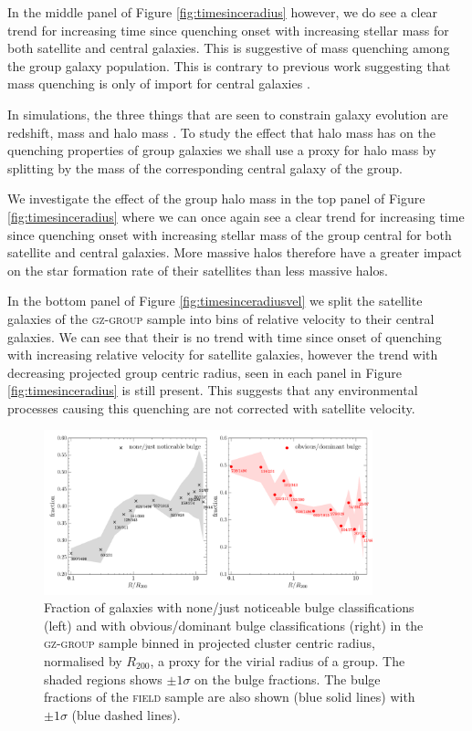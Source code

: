\documentclass[useAMS,usenatbib]{mn2e}
\begin{document}
In the middle panel of Figure \ref{fig:timesinceradius} however, we do see a clear trend for increasing time since quenching onset with increasing stellar mass for both satellite and central galaxies. This is suggestive of mass quenching among the group galaxy population. This is contrary to previous work suggesting that mass quenching is only of import for central galaxies \citep{ref, ref, ref}. 

In simulations, the three things that are seen to constrain galaxy evolution are redshift, mass and halo mass \cite{ref, ref}. To study the effect that halo mass has on the quenching properties of group galaxies we shall use a proxy for halo mass by splitting by the mass of the corresponding central galaxy of the group.

We investigate the effect of the group halo mass in the top panel of Figure \ref{fig:timesinceradius} where we can once again see a clear trend for increasing time since quenching onset with increasing stellar mass of the group central for both satellite and central galaxies. More massive halos therefore have a greater impact on the star formation rate of their satellites than less massive halos. 

In the bottom panel of Figure \ref{fig:timesinceradiusvel} we split the satellite galaxies of the \textsc{gz-group} sample into bins of relative velocity to their central galaxies. We can see that their is no trend with time since onset of quenching with increasing relative velocity for satellite galaxies, however the trend with decreasing projected group centric radius, seen in each panel in Figure \ref{fig:timesinceradius} is still present. This suggests that any environmental processes causing this quenching are not corrected with satellite velocity.  

\begin{figure}
\includegraphics[width=0.85\textwidth]{min_max_bulge_fraction_trend_with_log_radius.pdf}
\caption{Fraction of galaxies with none/just noticeable bulge classifications (left) and with obvious/dominant bulge classifications (right) in the \textsc{gz-group} sample binned in projected cluster centric radius, normalised by $R_{200}$, a proxy for the virial radius of a group. The shaded regions shows $\pm1\sigma$ on the bulge fractions. The bulge fractions of the \textsc{field} sample are also shown (blue solid lines) with $\pm1\sigma$ (blue dashed lines).}
\label{fig:bulgeradius}
\end{figure}
\end{document}
